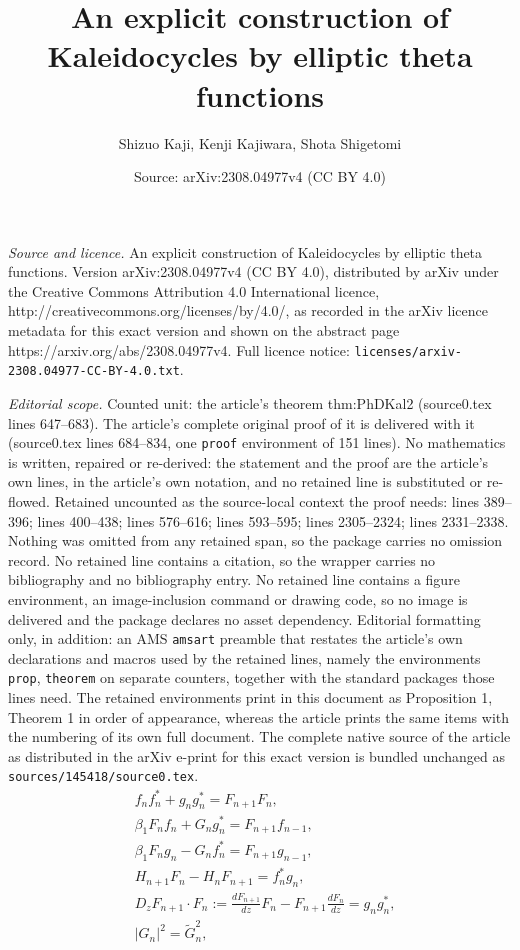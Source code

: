 \documentclass[10pt,a4paper]{amsart}
\title{An explicit construction of Kaleidocycles by elliptic theta functions}
\author{Shizuo Kaji, Kenji Kajiwara, Shota Shigetomi}
\date{Source: arXiv:2308.04977v4 (CC BY 4.0)}
\begin{document}
\maketitle

\noindent\emph{Source and licence.} An explicit construction of Kaleidocycles by elliptic theta functions. Version arXiv:2308.04977v4 (CC BY 4.0), distributed by arXiv under the Creative Commons Attribution 4.0 International licence, http://creativecommons.org/licenses/by/4.0/, as recorded in the arXiv licence metadata for this exact version and shown on the abstract page https://arxiv.org/abs/2308.04977v4. Full licence notice: \texttt{licenses/arxiv-2308.04977-CC-BY-4.0.txt}.\par\smallskip

\noindent\textit{Editorial scope.} Counted unit: the article's theorem thm:PhDKal2 (source0.tex lines 647--683). The article's complete original proof of it is delivered with it (source0.tex lines 684--834, one \texttt{proof} environment of 151 lines). No mathematics is written, repaired or re-derived: the statement and the proof are the article's own lines, in the article's own notation, and no retained line is substituted or re-flowed.  Retained uncounted as the source-local context the proof needs: lines 389--396; lines 400--438; lines 576--616; lines 593--595; lines 2305--2324; lines 2331--2338.  Nothing was omitted from any retained span, so the package carries no omission record.  No retained line contains a citation, so the wrapper carries no bibliography and no bibliography entry.  No retained line contains a figure environment, an image-inclusion command or drawing code, so no image is delivered and the package declares no asset dependency.  Editorial formatting only, in addition: an AMS \texttt{amsart} preamble that restates the article's own declarations and macros used by the retained lines, namely the environments \texttt{prop}, \texttt{theorem} on separate counters, together with the standard packages those lines need.  The retained environments print in this document as Proposition 1, Theorem 1 in order of appearance, whereas the article prints the same items with the numbering of its own full document.  The complete native source of the article as distributed in the arXiv e-print for this exact version is bundled unchanged as \texttt{sources/145418/source0.tex}.
\begin{align}
&f_{n}f_{n}^*+g_{n}g_{n}^*=F_{n+1}F_{n} \label{i1},\\
&\beta_{1} F_{n}f_{n}+G_{n}g_{n}^*=F_{n+1}f_{n-1} \label{i2},\\
&\beta_{1} F_{n}g_{n}-G_{n}f_{n}^*=F_{n+1}g_{n-1} \label{i3},\\
&H_{n+1}F_{n}-H_{n}F_{n+1}=f_{n}^*g_{n} \label{i4},\\
&D_zF_{n+1}\cdot F_{n}:=\frac{dF_{n+1}}{dz}F_{n}-F_{n+1}\frac{dF_{n}}{dz}=g_{n}g_{n}^* \label{i5},\\
&\left|G_{n}\right|^{2}=\widetilde{G}_{n}^{2},\label{i6}
\end{align}
\end{document}
